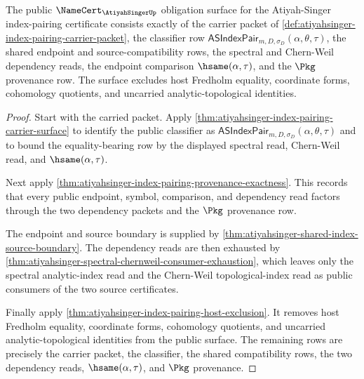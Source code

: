 \begin{theorem}
\label{thm:atiyahsinger-namecert-obligation-surface}
The public $\NameCert_{\AtiyahSingerUp}$ obligation surface for the
Atiyah-Singer index-pairing certificate consists exactly of the carrier packet
of \autoref{def:atiyahsinger-index-pairing-carrier-packet}, the classifier row
$\mathsf{ASIndexPair}_{m,D,\sigma_D}(\alpha,\theta,\tau)$, the shared endpoint
and source-compatibility rows, the spectral and Chern-Weil dependency reads, the
endpoint comparison $\hsame(\alpha,\tau)$, and the $\Pkg$ provenance row. The
surface excludes host Fredholm equality, coordinate forms, cohomology quotients,
and uncarried analytic-topological identities.
\end{theorem}
\begin{proof}
Start with the carried packet. Apply
\autoref{thm:atiyahsinger-index-pairing-carrier-surface} to identify the public
classifier as
$\mathsf{ASIndexPair}_{m,D,\sigma_D}(\alpha,\theta,\tau)$ and to bound the
equality-bearing row by the displayed spectral read, Chern-Weil read, and
$\hsame(\alpha,\tau)$.

Next apply \autoref{thm:atiyahsinger-index-pairing-provenance-exactness}. This
records that every public endpoint, symbol, comparison, and dependency read
factors through the two dependency packets and the $\Pkg$ provenance row.

The endpoint and source boundary is supplied by
\autoref{thm:atiyahsinger-shared-index-source-boundary}. The dependency reads
are then exhausted by
\autoref{thm:atiyahsinger-spectral-chernweil-consumer-exhaustion}, which leaves
only the spectral analytic-index read and the Chern-Weil topological-index read
as public consumers of the two source certificates.

Finally apply \autoref{thm:atiyahsinger-index-pairing-host-exclusion}. It
removes host Fredholm equality, coordinate forms, cohomology quotients, and
uncarried analytic-topological identities from the public surface. The remaining
rows are precisely the carrier packet, the classifier, the shared compatibility
rows, the two dependency reads, $\hsame(\alpha,\tau)$, and $\Pkg$ provenance.
\end{proof}

